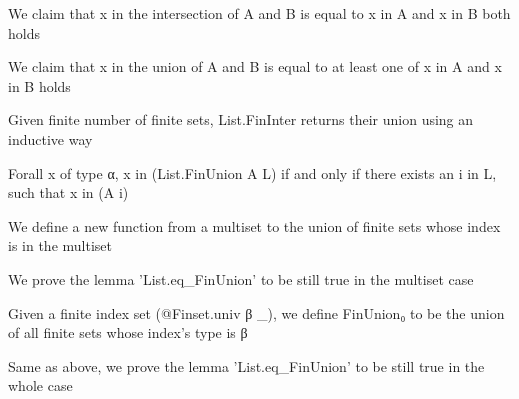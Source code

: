 \begin{lemma}\label{char_fun_inter}
                We claim that x in the intersection of A and B is equal to x in A and x in B both holds
    \end{lemma}

\begin{lemma}\label{char_fun_union}
                We claim that x in the union of A and B is equal to at least one of x in A and x in B holds
    \end{lemma}

\begin{definition}\label{List.FinUnion}
        \leanok
                Given finite number of finite sets, List.FinInter returns their union using an inductive way
    \end{definition}

\begin{lemma}\label{List.eq_FinUnion}
                Forall x of type α, x in (List.FinUnion A L) if and only if there exists an i in L, such that x in (A i)
    \end{lemma}

\begin{definition}\label{Multiset.FinUnion}
                We define a new function from a multiset to the union of finite sets whose index is in the multiset
    \end{definition}

\begin{lemma}\label{Multiset.eq_FinUnion}
                We prove the lemma 'List.eq_FinUnion' to be still true in the multiset case
    \end{lemma}

\begin{definition}\label{FinUnion₀}
                Given a finite index set (@Finset.univ β _), we define FinUnion₀ to be the union of all finite sets whose index's type is β
    \end{definition}

\begin{lemma}\label{eq_FinUnion₀}
                Same as above, we prove the lemma 'List.eq_FinUnion' to be still true in the whole case
    \end{lemma}

